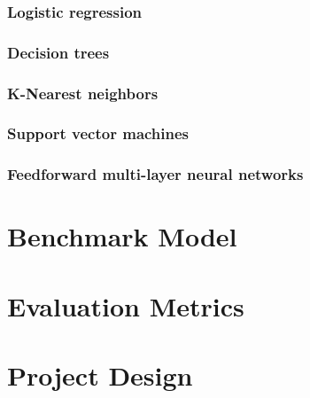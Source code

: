 \documentclass[12pt]{article}
\begin{document}
\subsubsection{Logistic regression}

\subsubsection{Decision trees}

\subsubsection{K-Nearest neighbors}

\subsubsection{Support vector machines}

\subsubsection{Feedforward multi-layer neural networks}

\section{Benchmark Model}

\section{Evaluation Metrics}

\section{Project Design}



\end{document}
